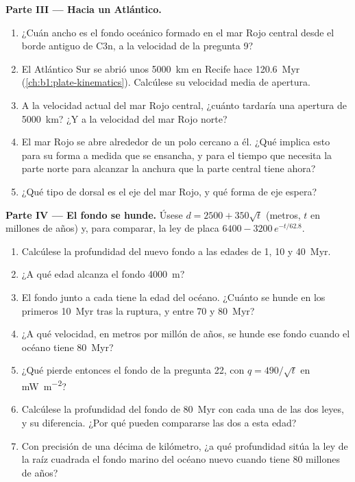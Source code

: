 \begin{problem}
\medskip
\noindent\textbf{Parte III --- Hacia un Atlántico.}
\begin{enumerate}[resume]
  \item ¿Cuán ancho es el fondo oceánico formado en el mar Rojo central desde el borde antiguo de C3n, a la velocidad de la pregunta 9?
  \item El Atlántico Sur se abrió unos \qty{5000}{km} en Recife hace \qty{120.6}{Myr} (\cref{ch:b1:plate-kinematics}). Calcúlese su velocidad
        media de apertura.
  \item A la velocidad actual del mar Rojo central, ¿cuánto tardaría una apertura de \qty{5000}{km}? ¿Y a la velocidad del mar Rojo norte?
  \item El mar Rojo se abre alrededor de un polo cercano a él. ¿Qué implica esto para su forma a medida que se ensancha, y para el tiempo
        que necesita la parte norte para alcanzar la anchura que la parte central tiene ahora?
  \item ¿Qué tipo de dorsal es el eje del mar Rojo, y qué forma de eje espera?
\end{enumerate}

\medskip
\noindent\textbf{Parte IV --- El fondo se hunde.} Úsese $d = 2500 + 350\sqrt t$ (metros, $t$ en millones de años) y, para comparar, la ley de
placa $6400 - 3200\,e^{-t/62.8}$.
\begin{enumerate}[resume]
  \item Calcúlese la profundidad del nuevo fondo a las edades de 1, 10 y \qty{40}{Myr}.
  \item ¿A qué edad alcanza el fondo \qty{4000}{m}?
  \item El fondo junto a cada  tiene la edad del océano. ¿Cuánto se hunde en los primeros \qty{10}{Myr} tras la ruptura, y entre
        70 y \qty{80}{Myr}?
  \item ¿A qué velocidad, en metros por millón de años, se hunde ese fondo cuando el océano tiene \qty{80}{Myr}?
  \item ¿Qué  pierde entonces el fondo de la pregunta 22, con $q = 490/\sqrt t$ en \unit{mW.m^{-2}}?
  \item Calcúlese la profundidad del fondo de \qty{80}{Myr} con cada una de las dos leyes, y su diferencia. ¿Por qué pueden compararse las dos a esta edad?
  \item Con precisión de una décima de kilómetro, ¿a qué profundidad sitúa la ley de la raíz cuadrada el fondo marino del océano nuevo cuando tiene 80 millones de años?
\end{enumerate}
\end{problem}
